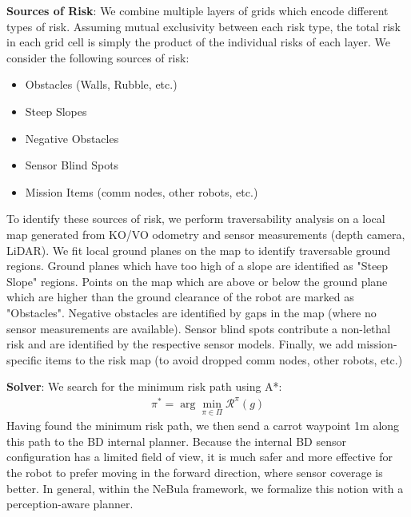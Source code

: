 \documentclass[a4paper, 10pt, conference]{ieeeconf}      %
\newcommand{\ph}[1]{{\textbf{#1}:}} %
\begin{document}
\ph{Sources of Risk} We combine multiple layers of grids which encode different types of risk.  Assuming mutual exclusivity between each risk type, the total risk in each grid cell is simply the product of the individual risks of each layer.  We consider the following sources of risk:
\begin{itemize}
    \item Obstacles (Walls, Rubble, etc.)
    \item Steep Slopes
    \item Negative Obstacles
    \item Sensor Blind Spots
    \item Mission Items (comm nodes, other robots, etc.)
\end{itemize}
To identify these sources of risk, we perform traversability analysis on a local map generated from KO/VO odometry and sensor measurements (depth camera, LiDAR).  We fit local ground planes on the map to identify traversable ground regions.  Ground planes which have too high of a slope are identified as "Steep Slope" regions.  Points on the map which are above or below the ground plane which are higher than the ground clearance of the robot are marked as "Obstacles".  Negative obstacles are identified by gaps in the map (where no sensor measurements are available).  Sensor blind spots contribute a non-lethal risk and are identified by the respective sensor models.  Finally, we add mission-specific items to the risk map (to avoid dropped comm nodes, other robots, etc.)  


\ph{Solver}
We search for the minimum risk path using A*:
\begin{align}
    \pi^* = \arg\min_{\pi\in\Pi}\mathcal{R}^{\pi}(g)
    \label{deterministic_plan}
\end{align}
Having found the minimum risk path, we then send a carrot waypoint 1m along this path to the BD internal planner.  Because the internal BD sensor configuration has a limited field of view, it is much safer and more effective for the robot to prefer moving in the forward direction, where sensor coverage is better.  In general, within the NeBula framework, we formalize this notion with a perception-aware planner.
\end{document}

